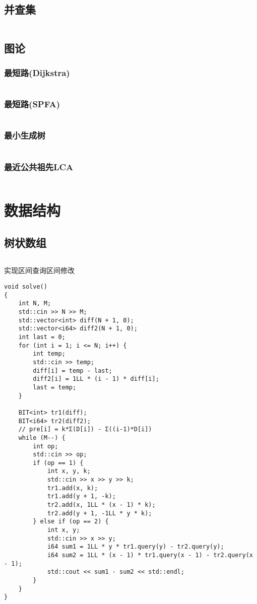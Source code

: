\documentclass[a4paper, 10pt]{paper}
\newcommand{\cpp}[1]{\inputminted[frame=single, linenos=true]{cpp}{#1}}
\begin{document}
        \subsection{并查集}
        \cpp{../DSU.cpp}

        \subsection{图论}
        \subsubsection{最短路(Dijkstra)}
        \cpp{../dijkstra.cpp}

        \subsubsection{最短路(SPFA)}
        \cpp{../SPFA.cpp}

        \subsubsection{最小生成树}
        \cpp{../dijkstra.cpp}

        \subsubsection{最近公共祖先LCA}
        \cpp{../最近公共祖先_LCA.cpp}

    \section{数据结构}
        \subsection{树状数组}
        \cpp{../BIT.cpp}
        实现区间查询区间修改
        \begin{verbatim}
void solve()
{
    int N, M;
    std::cin >> N >> M;
    std::vector<int> diff(N + 1, 0);
    std::vector<i64> diff2(N + 1, 0);
    int last = 0;
    for (int i = 1; i <= N; i++) {
        int temp;
        std::cin >> temp;
        diff[i] = temp - last;
        diff2[i] = 1LL * (i - 1) * diff[i];
        last = temp;
    }

    BIT<int> tr1(diff);
    BIT<i64> tr2(diff2);
    // pre[i] = k*Σ(D[i]) - Σ((i-1)*D[i])
    while (M--) {
        int op;
        std::cin >> op;
        if (op == 1) {
            int x, y, k;
            std::cin >> x >> y >> k;
            tr1.add(x, k);
            tr1.add(y + 1, -k);
            tr2.add(x, 1LL * (x - 1) * k);
            tr2.add(y + 1, -1LL * y * k);
        } else if (op == 2) {
            int x, y;
            std::cin >> x >> y;
            i64 sum1 = 1LL * y * tr1.query(y) - tr2.query(y);
            i64 sum2 = 1LL * (x - 1) * tr1.query(x - 1) - tr2.query(x - 1);
            std::cout << sum1 - sum2 << std::endl;
        }
    }
}
        \end{verbatim}
\end{document}
